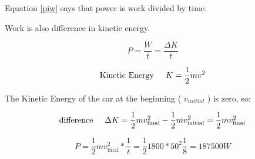 Equation \ref{piw} says that power is work divided by time.

Work is also difference in kinetic energy.

\begin{equation}
P=\frac{W}{t}=\frac{\Delta K}{t}
\end{equation}

\begin{equation}
\textrm{Kinetic Energy\hspace{0.5cm}} K=\frac{1}{2}mv^2
\end{equation}

The Kinetic Energy of the car at the beginning ( $v_{initial}$ ) is zero, so:

\begin{equation}
\textrm{difference\hspace{0.5cm}}\Delta K=\frac{1}{2}mv_\textrm{final}^2-\frac{1}{2}mv_\textrm{initial}^2=\frac{1}{2}mv_\textrm{final}^2
\end{equation}

\begin{equation}
P=\frac{1}{2}mv_\textrm{final}^2*\frac{1}{t}=
\frac{1}{2}1800*50^2\frac{1}{8}=187500 W
\end{equation}






